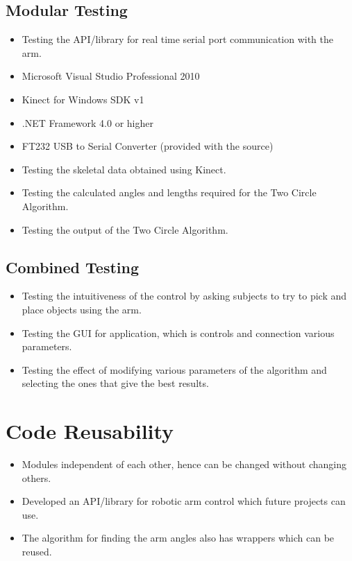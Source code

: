\documentclass[a4paper,11pt]{article}
\begin{document}
\subsection{Modular Testing}
\begin{itemize}
\item Testing the API/library for real time serial port communication with the arm.\item Microsoft Visual Studio Professional 2010
\item Kinect for Windows SDK v1
\item .NET Framework 4.0 or higher
\item FT232 USB to Serial Converter (provided with the source)

\item Testing the skeletal data obtained using Kinect.
\item Testing the calculated angles and lengths required for the Two Circle Algorithm.
\item Testing the output of the Two Circle Algorithm.
\end{itemize}


\subsection{Combined Testing}
\begin{itemize} 
\item Testing the intuitiveness of the control by asking subjects to try to pick and place objects using the arm.
\item Testing the GUI for application, which is controls and connection various parameters.
\item Testing the effect of modifying various parameters of the algorithm and selecting the ones that give the best results.
\end{itemize}

\section{Code Reusability}
\begin{itemize}
\item Modules independent of each other, hence can be changed without changing others.
\item Developed an API/library for robotic arm control which future projects can use.
\item The algorithm for finding the arm angles also has wrappers which can  be reused.
\end{itemize}
\end{document}
